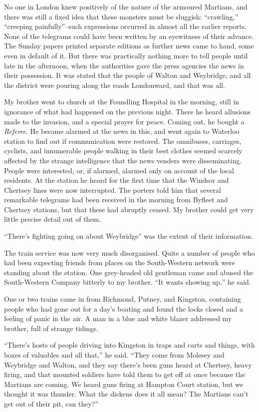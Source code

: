 No one in London knew positively of the nature of the armoured
Martians, and there was still a fixed idea that these monsters must
be sluggish: ``crawling,'' ``creeping painfully''--such expressions
occurred in almost all the earlier reports. None of the telegrams
could have been written by an eyewitness of their advance. The
Sunday papers printed separate editions as further news came to
hand, some even in default of it. But there was practically nothing
more to tell people until late in the afternoon, when the
authorities gave the press agencies the news in their possession.
It was stated that the people of Walton and Weybridge, and all the
district were pouring along the roads Londonward, and that was
all.

My brother went to church at the Foundling Hospital in the morning,
still in ignorance of what had happened on the previous night.
There he heard allusions made to the invasion, and a special prayer
for peace. Coming out, he bought a \emph{Referee}. He became
alarmed at the news in this, and went again to Waterloo station to
find out if communication were restored. The omnibuses, carriages,
cyclists, and innumerable people walking in their best clothes
seemed scarcely affected by the strange intelligence that the news
venders were disseminating. People were interested, or, if alarmed,
alarmed only on account of the local residents. At the station he
heard for the first time that the Windsor and Chertsey lines were
now interrupted. The porters told him that several remarkable
telegrams had been received in the morning from Byfleet and
Chertsey stations, but that these had abruptly ceased. My brother
could get very little precise detail out of them.

``There's fighting going on about Weybridge'' was the extent of their
information.

The train service was now very much disorganised. Quite a number of
people who had been expecting friends from places on the
South-Western network were standing about the station. One
grey-headed old gentleman came and abused the South-Western Company
bitterly to my brother. ``It wants showing up,'' he said.

One or two trains came in from Richmond, Putney, and Kingston,
containing people who had gone out for a day's boating and found
the locks closed and a feeling of panic in the air. A man in a blue
and white blazer addressed my brother, full of strange tidings.

``There's hosts of people driving into Kingston in traps and carts
and things, with boxes of valuables and all that,'' he said. ``They
come from Molesey and Weybridge and Walton, and they say there's
been guns heard at Chertsey, heavy firing, and that mounted
soldiers have told them to get off at once because the Martians are
coming. We heard guns firing at Hampton Court station, but we
thought it was thunder. What the dickens does it all mean? The
Martians can't get out of their pit, can they?''

